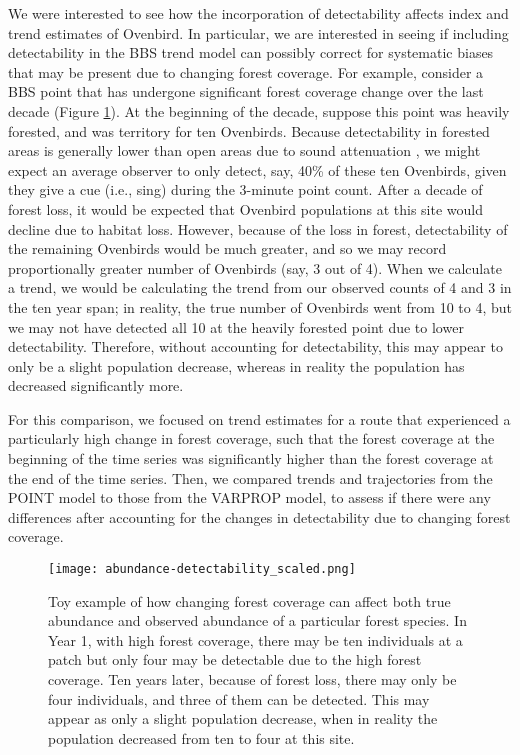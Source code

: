 \documentclass[12pt]{article}
\begin{document}
\par We were interested to see how the incorporation of detectability affects index and trend estimates of Ovenbird.
In particular, we are interested in seeing if including detectability in the BBS trend model can possibly correct for systematic biases that may be present due to changing forest coverage.
For example, consider a BBS point that has undergone significant forest coverage change over the last decade (Figure \ref{fig:example}).
At the beginning of the decade, suppose this point was heavily forested, and was territory for ten Ovenbirds. 
Because detectability in forested areas is generally lower than open areas due to sound attenuation \citep{yip_sound_2017}, we might expect an average observer to only detect, say, 40\% of these ten Ovenbirds, given they give a cue (i.e., sing) during the 3-minute point count.
After a decade of forest loss, it would be expected that Ovenbird populations at this site would decline due to habitat loss.
However, because of the loss in forest, detectability of the remaining Ovenbirds would be much greater, and so we may record proportionally greater number of Ovenbirds (say, 3 out of 4).
When we calculate a trend, we would be calculating the trend from our observed counts of 4 and 3 in the ten year span; in reality, the true number of Ovenbirds went from 10 to 4, but we may not have detected all 10 at the heavily forested point due to lower detectability.
Therefore, without accounting for detectability, this may appear to only be a slight population decrease, whereas in reality the population has decreased significantly more.

\par For this comparison, we focused on trend estimates for a route that experienced a particularly high change in forest coverage, such that the forest coverage at the beginning of the time series was significantly higher than the forest coverage at the end of the time series.
Then, we compared trends and trajectories from the POINT model to those from the VARPROP model, to assess if there were any differences after accounting for the changes in detectability due to changing forest coverage.

\begin{figure}[h]
	\texttt{[image: abundance-detectability\_scaled.png]}
	\caption{Toy example of how changing forest coverage can affect both true abundance and observed abundance of a particular forest species. In Year 1, with high forest coverage, there may be ten individuals at a patch but only four may be detectable due to the high forest coverage. Ten years later, because of forest loss, there may only be four individuals, and three of them can be detected. This may appear as only a slight population decrease, when in reality the population decreased from ten to four at this site.}
	\label{fig:example}
\end{figure}
\end{document}
